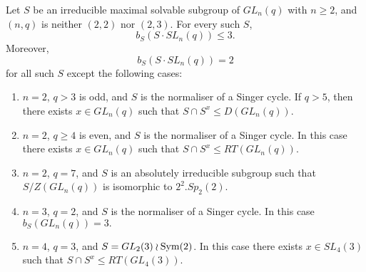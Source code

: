 
\begin{Th}\label{irred}
Let $S$ be an irreducible maximal solvable  subgroup of $GL_n(q)$ with $n \ge 2$, and $(n,q)$ is neither  $(2,2)$ nor $(2,3)$. For every such $S$, $$b_S(S \cdot SL_n(q)) \le 3.$$ Moreover, $$b_S(S \cdot SL_n(q))=2$$ for all such $S$ except the following cases: 
\begin{enumerate}[font=\normalfont]
\item $n =2$,  $q>3$ is odd, and $S$ is the normaliser of a Singer cycle. If $q>5$, then there exists $x\in GL_n(q)$ such that  $S \cap S^x \le D(GL_n(q)).$ \label{irred11}
\item $n =2$,  $q\ge 4$ is even, and $S$ is the normaliser of a Singer cycle. In this case there exists $x\in GL_n(q)$ such that  $S \cap S^x \le RT(GL_n(q)).$ \label{irred12}
\item $n=2$, $q=7$, and $S$  is an absolutely irreducible subgroup such that $S/Z(GL_n(q))$ is isomorphic to $2^2.Sp_2(2).$ \label{irred13}
\item $n=3$, $q=2$,  and $S$ is the normaliser of a Singer cycle. In this case $b_S(GL_n(q))=3.$ \label{irred14} 
\item $n=4$, $q=3$, and $S=GL_2(3) \wr \mathrm{Sym}(2)$. In this case there exists $x \in SL_4(3)$ such that $S \cap S^x \le RT(GL_4(3)).$ \label{irred15} %
\end{enumerate} 
\end{Th}
